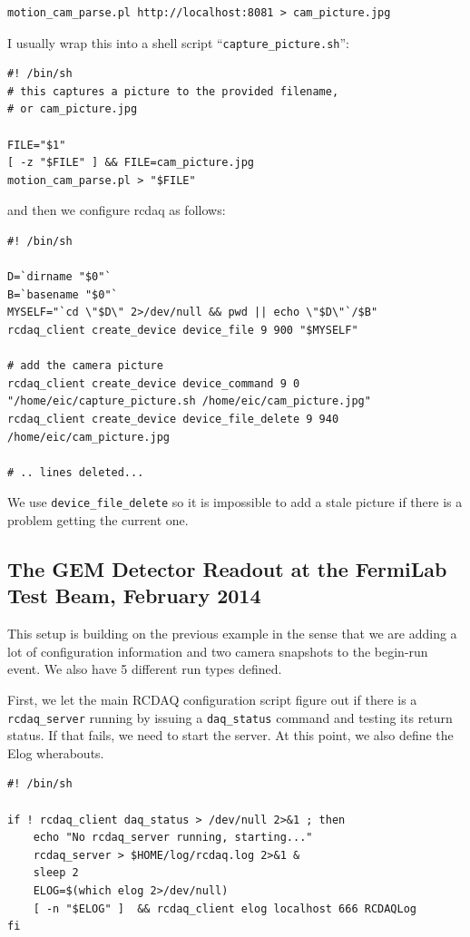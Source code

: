 \documentclass{article}[11pt]
\begin{document}
\begin{verbatim}
motion_cam_parse.pl http://localhost:8081 > cam_picture.jpg
\end{verbatim}

I usually wrap this into a shell script ``\verb|capture_picture.sh|'':

\begin{verbatim}
#! /bin/sh
# this captures a picture to the provided filename,
# or cam_picture.jpg

FILE="$1"
[ -z "$FILE" ] && FILE=cam_picture.jpg
motion_cam_parse.pl > "$FILE"

\end{verbatim}

and then we configure rcdaq as follows:
\label{packet900}

\begin{verbatim} 
#! /bin/sh

D=`dirname "$0"`
B=`basename "$0"`
MYSELF="`cd \"$D\" 2>/dev/null && pwd || echo \"$D\"`/$B"
rcdaq_client create_device device_file 9 900 "$MYSELF"

# add the camera picture
rcdaq_client create_device device_command 9 0 "/home/eic/capture_picture.sh /home/eic/cam_picture.jpg"
rcdaq_client create_device device_file_delete 9 940 /home/eic/cam_picture.jpg

# .. lines deleted...
\end{verbatim}

We use \verb|device_file_delete| so it is impossible to add a stale
picture if there is a problem getting the current one.

\subsection{The GEM Detector Readout at the FermiLab Test Beam, February 2014}

This setup is building on the previous example in the sense that 
we are adding a lot of configuration information and two camera 
snapshots to the begin-run event. We also have 5 different run types defined.

First, we let the main RCDAQ configuration script figure out if there
is a \verb|rcdaq_server| running by issuing a \verb|daq_status|
command and testing its return status. If that fails, we need to start
the server. At this point, we also define the Elog wherabouts.

\begin{verbatim} 
#! /bin/sh

if ! rcdaq_client daq_status > /dev/null 2>&1 ; then
    echo "No rcdaq_server running, starting..."
    rcdaq_server > $HOME/log/rcdaq.log 2>&1 &
    sleep 2
    ELOG=$(which elog 2>/dev/null)
    [ -n "$ELOG" ]  && rcdaq_client elog localhost 666 RCDAQLog
fi
\end{verbatim} 
\end{document}
